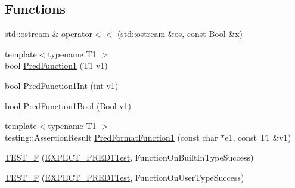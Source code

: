\subsection*{Functions}
\begin{DoxyCompactItemize}
\item 
std\+::ostream \& \mbox{\hyperlink{_obj__test_2lib_2googletest-master_2googletest_2test_2gtest__pred__impl__unittest_8cc_a0bf98bd8ef2c5ea5ea36ff15c1248b8a}{operator$<$$<$}} (std\+::ostream \&os, const \mbox{\hyperlink{struct_bool}{Bool}} \&\mbox{\hyperlink{_obj__test_2lib_2googletest-master_2googlemock_2test_2gmock-matchers__test_8cc_a6150e0515f7202e2fb518f7206ed97dc}{x}})
\item 
{\footnotesize template$<$typename T1 $>$ }\\bool \mbox{\hyperlink{_obj__test_2lib_2googletest-master_2googletest_2test_2gtest__pred__impl__unittest_8cc_aa8827b7fab495de26f406affdf47a697}{Pred\+Function1}} (T1 v1)
\item 
bool \mbox{\hyperlink{_obj__test_2lib_2googletest-master_2googletest_2test_2gtest__pred__impl__unittest_8cc_a0cfa23f9b62be9c5bf65d0971510bac5}{Pred\+Function1\+Int}} (int v1)
\item 
bool \mbox{\hyperlink{_obj__test_2lib_2googletest-master_2googletest_2test_2gtest__pred__impl__unittest_8cc_a1c12be7e61ecd333d5c9d5f251d3809f}{Pred\+Function1\+Bool}} (\mbox{\hyperlink{struct_bool}{Bool}} v1)
\item 
{\footnotesize template$<$typename T1 $>$ }\\testing\+::\+Assertion\+Result \mbox{\hyperlink{_obj__test_2lib_2googletest-master_2googletest_2test_2gtest__pred__impl__unittest_8cc_af5b63802199e417c73c46cbacc73f4ed}{Pred\+Format\+Function1}} (const char $\ast$e1, const T1 \&v1)
\item 
\mbox{\hyperlink{_obj__test_2lib_2googletest-master_2googletest_2test_2gtest__pred__impl__unittest_8cc_acf6422eca13944f695085fc6c7527748}{T\+E\+S\+T\+\_\+F}} (\mbox{\hyperlink{googletest-master_2googletest_2test_2gtest__pred__impl__unittest_8cc_ad745775376a8f891faadd4d168798bab}{E\+X\+P\+E\+C\+T\+\_\+\+P\+R\+E\+D1\+Test}}, Function\+On\+Built\+In\+Type\+Success)
\item 
\mbox{\hyperlink{_obj__test_2lib_2googletest-master_2googletest_2test_2gtest__pred__impl__unittest_8cc_a7ae9f4aac70507b021c7f828ba06c600}{T\+E\+S\+T\+\_\+F}} (\mbox{\hyperlink{googletest-master_2googletest_2test_2gtest__pred__impl__unittest_8cc_ad745775376a8f891faadd4d168798bab}{E\+X\+P\+E\+C\+T\+\_\+\+P\+R\+E\+D1\+Test}}, Function\+On\+User\+Type\+Success)

\end{DoxyCompactItemize}
